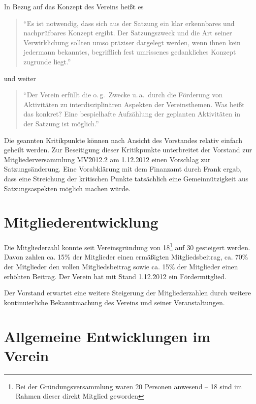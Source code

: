 \documentclass[10pt,DIV16]{scrartcl}
\begin{document}
In Bezug auf das Konzept des Vereins heißt es

\begin{quote}
	"`Es ist notwendig, dass sich aus der Satzung ein klar erkennbares und
	nachprüfbares Konzept ergibt.  Der Satzungszweck und die Art seiner
	Verwirklichung sollten umso präziser dargelegt werden, wenn ihnen kein
	jedermann bekanntes, begrifflich fest umrissenes gedankliches Konzept
	zugrunde liegt."'
\end{quote}

und weiter

\begin{quote}
	"`Der Verein erfüllt die o.\,g.\ Zwecke u.\,a.\ durch \glq die Förderung von
	Aktivitäten zu interdisziplinären Aspekten der Vereinsthemen\grq.  Was heißt
	das konkret?  Eine bespielhafte Aufzählung der geplanten Aktivitäten in
	der Satzung ist möglich."'
\end{quote}

Die geannten Kritikpunkte können nach Ansicht des Vorstandes relativ 
einfach geheilt werden. Zur Beseitigung dieser Kritikpunkte 
unterbreitet der Vorstand zur Mitgliederversammlung MV2012.2 am 
1.12.2012 einen Vorschlag zur Satzungsänderung. Eine Vorabklärung 
mit dem Finanzamt durch Frank ergab, dass eine Streichung der 
kritischen Punkte tatsächlich eine Gemeinnützigkeit aus 
Satzungsaspekten möglich machen würde. 

\section{Mitgliederentwicklung}

Die Mitgliederzahl konnte seit Vereinsgründung von 18\footnote{Bei 
der Gründungsversammlung waren 20 Personen anwesend -- 18 sind im 
Rahmen dieser direkt Mitglied geworden} auf 30 gesteigert werden. 
Davon zahlen ca. 15\% der Mitglieder einen ermäßigten 
Mitgliedsbeitrag, ca. 70\% der Mitglieder den vollen 
Mitgliedsbeitrag sowie ca. 15\% der Mitglieder einen erhöhten 
Beitrag. Der Verein hat mit Stand 1.12.2012 ein Fördermitglied. 

Der Vorstand erwartet eine weitere Steigerung der Mitgliederzahlen durch 
weitere kontinuierliche Bekanntmachung des Vereins und seiner 
Veranstaltungen.

\section{Allgemeine Entwicklungen im Verein}
\end{document}
